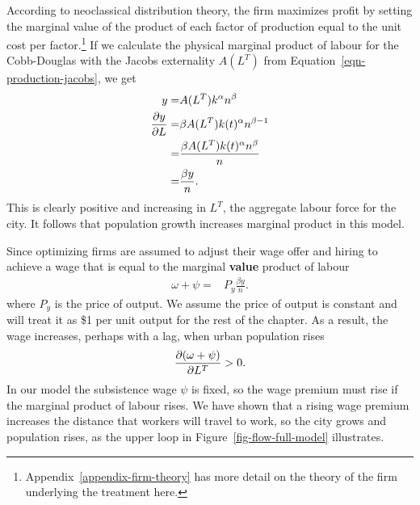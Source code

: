 According to \gls{neoclassical distribution theory}, the firm maximizes profit by setting the marginal value of the product of each \gls{factor of production} equal to the unit cost per factor.\footnote{Appendix~\ref{appendix-firm-theory} has more detail on the theory of the firm underlying the treatment here.} If we calculate the physical marginal product of labour for the Cobb-Douglas with the Jacobs externality $A(L^T)$ from Equation~\ref{eqn-production-jacobs}, we get 
\begin{align}\label{eqn-model-MPL}
y              =&  A(L^T) k^\alpha n^\beta \nonumber\\ 
\frac{\partial y}{\partial L}     =&\beta A(L^T) k(t)^\alpha n^{\beta-1} \nonumber\\
                =&\frac{\beta A(L^T) k(t)^\alpha n^\beta}{n} \nonumber\\
                =& \frac{\beta y}{n}.
\end{align}
This is clearly positive and increasing in $L^T$, the aggregate labour force for the city.  It follows that population growth increases marginal product in this model. 


Since optimizing firms are assumed to adjust their wage offer and hiring to achieve a wage that is equal to the  marginal \textbf{value} product of labour 
\begin{align}\label{eqn-model-MPL-w}
             \omega + \psi   =& P_y\frac{\beta y}{n}.
\end{align}
where $P_y$ is the price of output. We assume the price of output is constant and will treat it as \$1 per unit output for the rest of the chapter. As a result, the wage increases, perhaps with a lag, when urban population  rises 
\begin{equation}
 \frac{\partial (\omega + \psi)}{\partial L^T} >0.
\label{eqn-wage-population}
\end{equation}
In our model the subsistence wage $\psi$ is fixed, so the wage premium must rise if the marginal product of labour rises.  We have shown that a rising wage premium increases the distance that workers will travel to work, so the city grows and population rises, as the upper loop in Figure~\ref{fig-flow-full-model} illustrates. 

 

